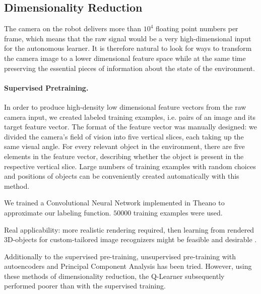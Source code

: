 \documentclass[10pt,a4paper]{article}
\begin{document}


\subsection{Dimensionality Reduction}
The camera on the robot delivers more than $10^4$ floating point numbers per frame, which means that the raw signal would be a very high-dimensional input for the autonomous learner.
It is therefore natural to look for ways to transform the camera image to a lower dimensional feature space while at the same time preserving the essential pieces of information about the state of the environment.



\paragraph{Supervised Pretraining.}
In order to produce high-density low dimensional feature vectors from the raw camera input, we created labeled training examples, i.e. pairs of an image and its target feature vector.
The format of the feature vector was manually designed: we divided the camera's field of vision into five vertical slices, each taking up the same visual angle.
For every relevant object in the environment, there are five elements in the feature vector, describing whether the object is present in the respective vertical slice.
Large numbers of training examples with random choices and positions of objects can be conveniently created automatically with this method.

We trained a Convolutional Neural Network \cite{?} implemented in Theano \cite{?} to approximate our labeling function. 
$50000$ training examples were used.

Real applicability: more realistic rendering required, then learning from rendered 3D-objects for custom-tailored image recognizers might be feasible and desirable \cite{??}.

Additionally to the supervised pre-training, unsupervised pre-training with autoencoders and Principal Component Analysis has been tried. 
However, using these methods of dimensionality reduction, the Q-Learner subsequently performed poorer than with the supervised training.
\end{document}
